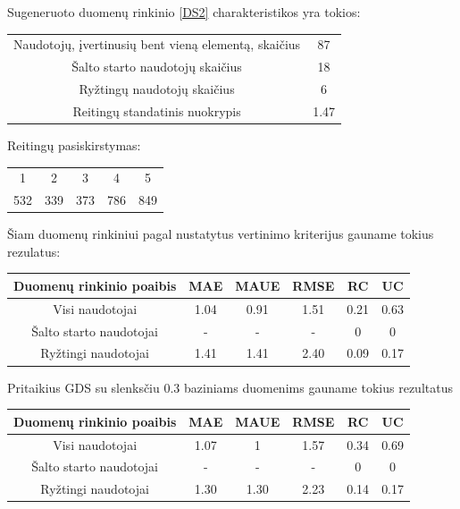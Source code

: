 \documentclass{VUMIFInfMagistrinis}
\begin{document}
Sugeneruoto duomenų rinkinio \ref{DS2} charakteristikos yra tokios:
\begin{center}
	\begin{tabular}{||c c||} 
		Naudotojų, įvertinusių bent vieną elementą, skaičius & 87 \\
		Šalto starto naudotojų skaičius & 18 \\
		Ryžtingų naudotojų skaičius  & 6 \\
		Reitingų standatinis nuokrypis & 1.47 \\
	\end{tabular}
\end{center}
Reitingų pasiskirstymas:
\begin{center}
	\begin{tabular}{||c c c c c||} 
		1 & 2 & 3 & 4 & 5 \\
		532 & 339 & 373 & 786 & 849 \\
	\end{tabular}
\end{center}
\indent
Šiam duomenų rinkiniui pagal nustatytus vertinimo kriterijus gauname tokius rezulatus:
\begin{center}
	\begin{tabular}{||c c c c c c||} 
		Duomenų rinkinio poaibis & MAE & MAUE & RMSE & RC & UC \\
		\hline
		Visi naudotojai & 1.04 & 0.91 & 1.51 & 0.21 & 0.63 \\
		\hline
		Šalto starto naudotojai & - & - & - & 0 & 0 \\
		\hline
		Ryžtingi naudotojai & 1.41 & 1.41 & 2.40 & 0.09 & 0.17 \\
		
	\end{tabular}
\end{center}
\indent
Pritaikius GDS su slenksčiu 0.3 baziniams duomenims gauname tokius rezultatus
\begin{center}
	\begin{tabular}{||c c c c c c||} 
		Duomenų rinkinio poaibis & MAE & MAUE & RMSE & RC & UC \\
		\hline
		Visi naudotojai & 1.07 & 1 & 1.57 & 0.34 & 0.69 \\
		\hline
		Šalto starto naudotojai & - & - & - & 0 & 0 \\
		\hline
		Ryžtingi naudotojai & 1.30 & 1.30 & 2.23 & 0.14 & 0.17 \\
		
	\end{tabular}
\end{center}
\end{document}
